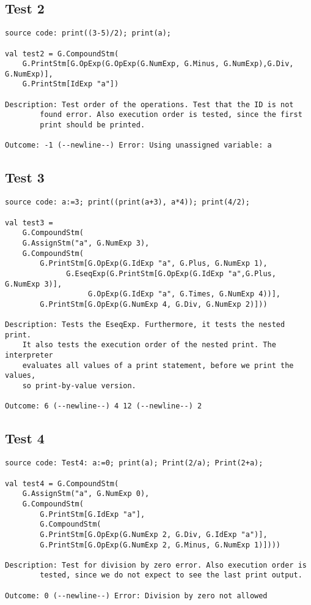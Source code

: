 \documentclass[a4paper]{article}
\begin{document}
\subsection{Test 2}
\begin{lstlisting}
source code: print((3-5)/2); print(a);

val test2 = G.CompoundStm(
	G.PrintStm[G.OpExp(G.OpExp(G.NumExp, G.Minus, G.NumExp),G.Div, G.NumExp)],
	G.PrintStm[IdExp "a"])

Description: Test order of the operations. Test that the ID is not
		found error. Also execution order is tested, since the first 
		print should be printed.

Outcome: -1 (--newline--) Error: Using unassigned variable: a
\end{lstlisting}

\subsection{Test 3}
\begin{lstlisting}
source code: a:=3; print((print(a+3), a*4)); print(4/2);

val test3 = 
    G.CompoundStm(
	G.AssignStm("a", G.NumExp 3),
	G.CompoundStm(
	    G.PrintStm[G.OpExp(G.IdExp "a", G.Plus, G.NumExp 1), 
		      G.EseqExp(G.PrintStm[G.OpExp(G.IdExp "a",G.Plus, G.NumExp 3)],
			       G.OpExp(G.IdExp "a", G.Times, G.NumExp 4))],
	    G.PrintStm[G.OpExp(G.NumExp 4, G.Div, G.NumExp 2)]))

Description: Tests the EseqExp. Furthermore, it tests the nested print.
	It also tests the execution order of the nested print. The interpreter
	evaluates all values of a print statement, before we print the values,
	so print-by-value version. 

Outcome: 6 (--newline--) 4 12 (--newline--) 2
\end{lstlisting}

\subsection{Test 4}
\begin{lstlisting}
source code: Test4: a:=0; print(a); Print(2/a); Print(2+a);

val test4 = G.CompoundStm(
	G.AssignStm("a", G.NumExp 0),
	G.CompoundStm(
	    G.PrintStm[G.IdExp "a"],
	    G.CompoundStm(
		G.PrintStm[G.OpExp(G.NumExp 2, G.Div, G.IdExp "a")],
		G.PrintStm[G.OpExp(G.NumExp 2, G.Minus, G.NumExp 1)])))

Description: Test for division by zero error. Also execution order is
		tested, since we do not expect to see the last print output.

Outcome: 0 (--newline--) Error: Division by zero not allowed
\end{lstlisting}
\end{document}
